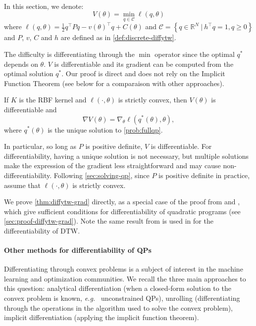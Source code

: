 \paragraph{}
In this section, we denote:
\begin{equation}\label{prob:fullqp}
    V(\theta) = \min_{q\in\mathcal C} \ell(q, \theta)
\end{equation}
where $\ell(q, \theta) = \frac{1}{2} q^\top Pq - v(\theta)^\top q + C(\theta)$ and $\mathcal C = \left\lbrace q\in\mathbb R^N ~\vert~ h^\top q=1, q \geq 0\right\rbrace$ and $P$, $v$, $C$ and $h$ are defined as in \cref{def:discrete-diffytw}.

The difficulty is differentiating through the $\min$ operator since the optimal $q^*$ depends on $\theta$. $V$ is differentiable and its gradient can be computed from the optimal solution $q^*$. Our proof is direct and does not rely on the Implicit Function Theorem (see below for a comparaison with other approaches).

\begin{theorem}\label{thm:diffytw-grad}
    If $K$ is the RBF kernel and $\ell(\cdot, \theta)$ is strictly convex, then $V(\theta)$ is differentiable and
    \begin{equation}
         \nabla V(\theta) = \nabla_\theta \ell(q^*(\theta), \theta),
    \end{equation} where $q^*(\theta)$ is the unique solution to \cref{prob:fullqp}.
\end{theorem}

In particular, so long as $P$ is positive definite, $V$ is differentiable. For differentiability, having a unique solution is not necessary, but multiple solutions make the expression of the gradient less straightforward and may cause non-differentiability. Following \cref{sec:solving-qp}, since $P$ is positive definite in practice, assume that $\ell(\cdot, \theta)$ is strictly convex.

We prove \cref{thm:diffytw-grad} directly, as a special case of the proof from \cite{shapiro} and \cite{lee}, which give sufficient conditions for differentiability of quadratic programs (see \cref{sec:proof-diffytw-grad}). Note the same result from \citep{shapiro} is used in \cite{tavenard-dtw-diff} for the differentiability of DTW.

\paragraph{Other methods for differentiability of QPs}
Differentiating through convex problems is a subject of interest in the machine learning and optimization communities. We recall the three main approaches to this question: analytical differentiation (when a closed-form solution to the convex problem is known, \emph{e.g.\ } unconstrained QPs), unrolling (differentiating through the operations in the algorithm used to solve the convex problem), implicit differentiation (applying the implicit function theorem).

